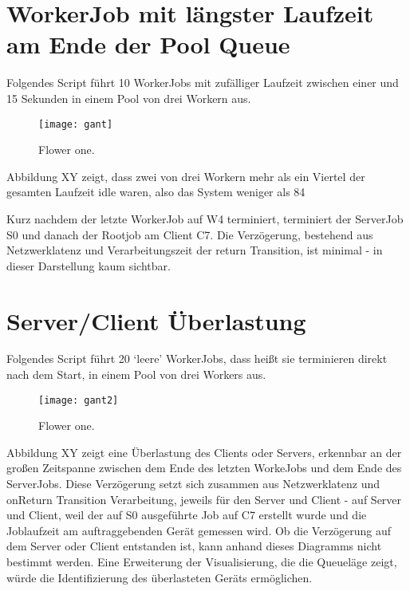 \section{WorkerJob mit längster Laufzeit am Ende der Pool Queue}
Folgendes Script führt 10 WorkerJobs mit zufälliger Laufzeit zwischen einer und 15 Sekunden in einem Pool von drei Workern aus.
\begin{figure}[H]
  \centering
    \texttt{[image: gant]}
    \caption{Flower one.}
\end{figure}
\noindent Abbildung XY zeigt, dass zwei von drei Workern mehr als ein Viertel der gesamten Laufzeit idle waren, also das System weniger als 84%

Kurz nachdem der letzte WorkerJob auf W4 terminiert, terminiert der ServerJob S0 und danach der Rootjob am Client C7. Die Verzögerung, bestehend aus Netzwerklatenz und Verarbeitungszeit der return Transition, ist minimal - in dieser Darstellung kaum sichtbar.





\section{Server/Client Überlastung}
Folgendes Script führt 20 ‘leere’ WorkerJobs, dass heißt sie terminieren direkt nach dem Start, in einem Pool von drei Workers aus.
\begin{figure}[H]
  \centering
    \texttt{[image: gant2]}
    \caption{Flower one.}
\end{figure}
\noindent Abbildung XY zeigt eine Überlastung des Clients oder Servers, erkennbar an der großen Zeitspanne zwischen dem Ende des letzten WorkeJobs und dem Ende des ServerJobs. Diese Verzögerung setzt sich zusammen aus Netzwerklatenz und onReturn Transition Verarbeitung, jeweils für den Server und Client - auf Server und Client, weil der auf S0 ausgeführte Job auf C7 erstellt wurde und die Joblaufzeit am auftraggebenden Gerät gemessen wird. Ob die Verzögerung auf dem Server oder Client entstanden ist, kann anhand dieses Diagramms nicht bestimmt werden. Eine Erweiterung der Visualisierung, die die Queueläge zeigt, würde die Identifizierung des überlasteten Geräts ermöglichen.




